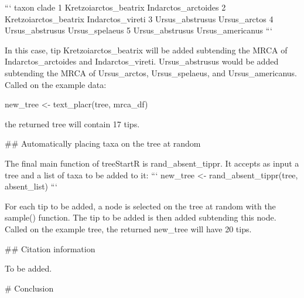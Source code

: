 ```
                  taxon               clade
1 Kretzoiarctos_beatrix Indarctos_arctoides
2 Kretzoiarctos_beatrix    Indarctos_vireti
3       Ursus_abstrusus        Ursus_arctos
4       Ursus_abstrusus      Ursus_spelaeus
5       Ursus_abstrusus    Ursus_americanus
```

In this case, tip Kretzoiarctos_beatrix will be added subtending the MRCA of Indarctos_arctoides and Indarctos_vireti.
Ursus_abstrusus would be added subtending the MRCA of Ursus_arctos, Ursus_spelaeus, and Ursus_americanus. 
Called on the example data: 

new_tree <- text_placr(tree, mrca_df)

the returned tree will contain 17 tips.

## Automatically placing taxa on the tree at random

The final main function of treeStartR is rand_absent_tippr. 
It accepts as input a tree and a list of taxa to be added to it:
```
new_tree <- rand_absent_tippr(tree, absent_list)
```

For each tip to be added, a node is selected on the tree at random with the sample() function.
The tip to be added is then added subtending this node.
Called on the example tree, the returned new_tree will have 20 tips.

## Citation information

To be added.
 
# Conclusion
